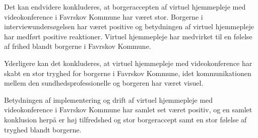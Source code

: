 Det kan endvidere konkluderes, at borgeraccepten af virtuel hjemmepleje med videokonference i Favrskov Kommune har været stor. Borgerne i interviewundersøgelsen har været positive og betydningen af virtuel hjemmepleje har medført positive reaktioner. Virtuel hjemmepleje har medvirket til en følelse af frihed blandt borgerne i Favrskov Kommune.

Yderligere kan det konkluderes, at virtuel hjemmepleje med videokonference har skabt en stor tryghed for borgerne i Favrskov Kommune, idet kommunikationen mellem den sundhedsprofessionelle og borgeren har været visuel. 

Betydningen af implementering og drift af virtuel hjemmepleje med videokonference i Favrskov Kommune har samlet set været positiv, og en samlet konklusion herpå er høj tilfredshed og stor borgeraccept samt en stor følelse af tryghed blandt borgerne. 












